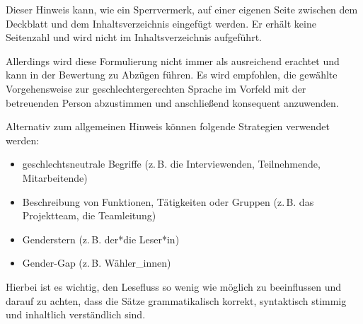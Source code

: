 Dieser Hinweis kann, wie ein Sperrvermerk, auf einer eigenen Seite zwischen dem Deckblatt und dem Inhaltsverzeichnis eingefügt werden. Er erhält keine Seitenzahl und wird nicht im Inhaltsverzeichnis aufgeführt.

Allerdings wird diese Formulierung nicht immer als ausreichend erachtet und kann in der Bewertung zu Abzügen führen. Es wird empfohlen, die gewählte Vorgehensweise zur geschlechtergerechten Sprache im Vorfeld mit der betreuenden Person abzustimmen und anschließend konsequent anzuwenden.

Alternativ zum allgemeinen Hinweis können folgende Strategien verwendet werden:
\begin{itemize}
    \item geschlechtsneutrale Begriffe (z.\,B. die Interviewenden, Teilnehmende, Mitarbeitende)
    \item Beschreibung von Funktionen, Tätigkeiten oder Gruppen (z.\,B. das Projektteam, die Teamleitung)
    \item Genderstern (z.\,B. der*die Leser*in)
    \item Gender-Gap (z.\,B. Wähler\_innen)
\end{itemize}

Hierbei ist es wichtig, den Lesefluss so wenig wie möglich zu beeinflussen und darauf zu achten, dass die Sätze grammatikalisch korrekt, syntaktisch stimmig und inhaltlich verständlich sind.
